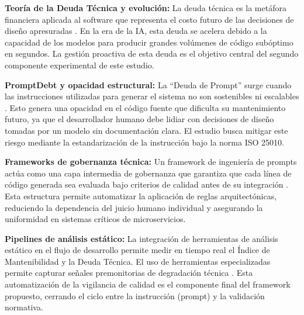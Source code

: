 
\begin{listaIV}
\item \textbf{Teoría de la Deuda Técnica y evolución:} La deuda técnica es la metáfora financiera aplicada al software que representa el costo futuro de las decisiones de diseño apresuradas \cite{gutierrez2024analisis}. En la era de la IA, esta deuda se acelera debido a la capacidad de los modelos para producir grandes volúmenes de código subóptimo en segundos. La gestión proactiva de esta deuda es el objetivo central del segundo componente experimental de este estudio.

\item \textbf{PromptDebt y opacidad estructural:} La ``Deuda de Prompt'' surge cuando las instrucciones utilizadas para generar el sistema no son sostenibles ni escalables \cite{aljohani2024promptdebt}. Esto genera una opacidad en el código fuente que dificulta su mantenimiento futuro, ya que el desarrollador humano debe lidiar con decisiones de diseño tomadas por un modelo sin documentación clara. El estudio busca mitigar este riesgo mediante la estandarización de la instrucción bajo la norma ISO 25010.
\end{listaIV}


\begin{listaIV}
\item \textbf{Frameworks de gobernanza técnica:} Un framework de ingeniería de prompts actúa como una capa intermedia de gobernanza que garantiza que cada línea de código generada sea evaluada bajo criterios de calidad antes de su integración \cite{ortega2026arquitecturas}. Esta estructura permite automatizar la aplicación de reglas arquitectónicas, reduciendo la dependencia del juicio humano individual y asegurando la uniformidad en sistemas críticos de microservicios.

\item \textbf{Pipelines de análisis estático:} La integración de herramientas de análisis estático en el flujo de desarrollo permite medir en tiempo real el Índice de Mantenibilidad y la Deuda Técnica. El uso de herramientas especializadas permite capturar señales premonitorias de degradación técnica \cite{cuatecontzi2023identificacion}. Esta automatización de la vigilancia de calidad es el componente final del framework propuesto, cerrando el ciclo entre la instrucción (prompt) y la validación normativa.
\end{listaIV}